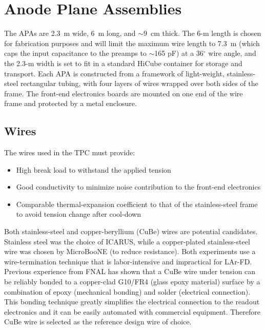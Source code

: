 \section{Anode Plane Assemblies}
\label{subsec:v5-tpc-chamber-apa}

The APAs are 2.3~m wide, 6~m long, and $\sim 9$~cm thick. The 6-m length is chosen for fabrication purposes and will limit the maximum wire length to 7.3~m (which caps the input capacitance to the preamps to $\sim$165 pF) at a 36$^\circ$ wire angle, and the 2.3-m width is set to fit in a standard HiCube container for storage and transport. 
Each APA is constructed from a framework of light-weight, stainless-steel rectangular tubing, 
with four layers of
wires wrapped over both sides of the frame.  The front-end electronics boards are mounted on 
one end of the wire frame and protected by a metal enclosure.  

\subsection{Wires}

The wires used in the TPC must provide:
\begin{itemize}
\item High break load to withstand the applied tension 
\item Good conductivity to minimize noise contribution to the front-end electronics
\item Comparable thermal-expansion coefficient to that of the stainless-steel 
frame to avoid tension change after cool-down
\end{itemize}

Both stainless-steel and copper-beryllium (CuBe) wires are potential candidates.  
Stainless steel was the choice of ICARUS, while a copper-plated 
stainless-steel wire was chosen by MicroBooNE  (to reduce resistance).  Both experiments use a wire-termination 
technique that is labor-intensive and impractical for LAr-FD. Previous experience from FNAL \cite{FNAL-proto-APA} has shown that a CuBe wire under 
tension can be reliably bonded to a copper-clad G10/FR4 (glass epoxy material) surface by a combination of  epoxy (mechanical bonding) 
and solder (electrical connection).  This bonding technique greatly simplifies the electrical 
connection to the readout electronics and it can be easily automated 
with commercial equipment.  Therefore CuBe wire is 
selected as the reference design wire of choice.

